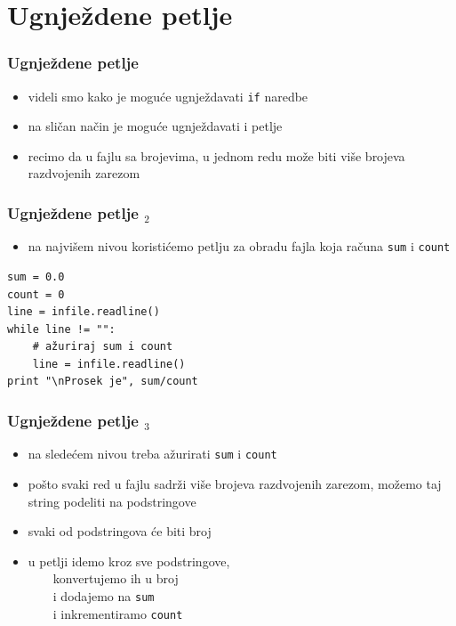 \documentclass[utf8,compress]{beamer}
\begin{document}
\section[Ugnježdavanje]{Ugnježdene petlje}

\begin{frame}[fragile]
  \frametitle{Ugnježdene petlje}
  \begin{itemize}
    \item videli smo kako je moguće ugnježdavati \texttt{if} naredbe
    \item na sličan način je moguće ugnježdavati i petlje
    \item recimo da u fajlu sa brojevima, u jednom redu može biti više brojeva razdvojenih zarezom
  \end{itemize}
\end{frame}

\begin{frame}[fragile]
  \frametitle{Ugnježdene petlje $_2$}
  \begin{itemize}
    \item na najvišem nivou koristićemo petlju za obradu fajla koja računa \texttt{sum} i \texttt{count}
  \end{itemize}
\begin{verbatim}
sum = 0.0
count = 0
line = infile.readline()
while line != "":
    # ažuriraj sum i count
    line = infile.readline()
print "\nProsek je", sum/count
\end{verbatim}
\end{frame}

\begin{frame}[fragile]
  \frametitle{Ugnježdene petlje $_3$}
  \begin{itemize}
    \item na sledećem nivou treba ažurirati \texttt{sum} i \texttt{count}
    \item pošto svaki red u fajlu sadrži više brojeva razdvojenih zarezom, možemo taj string podeliti na podstringove
    \item svaki od podstringova će biti broj
    \item u petlji idemo kroz sve podstringove, \\
    \ \ \ \ konvertujemo ih u broj \\
    \ \ \ \ i dodajemo na \texttt{sum} \\
    \ \ \ \ i inkrementiramo \texttt{count}
  \end{itemize}
\end{frame}
\end{document}

